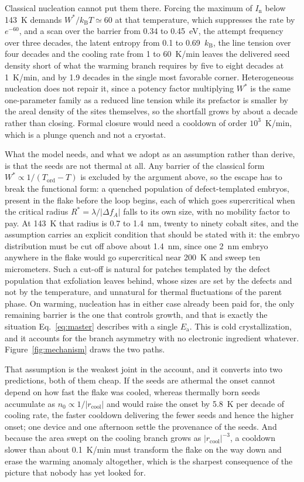 \documentclass[reprint,twocolumn,prb,amsmath,amssymb,superscriptaddress,floatfix]{revtex4-2}
\newcommand{\kB}{k_{\mathrm{B}}}
\newcommand{\Ea}{E_{\mathrm{a}}}
\newcommand{\Tcol}{T_{\mathrm{ord}}}
\begin{document}
Classical nucleation cannot put them there. Forcing the maximum of $I_{\mathrm{n}}$ below 143~K
demands $W^{*}/\kB T\simeq60$ at that temperature, which suppresses the rate by $e^{-60}$, and
a scan over the barrier from 0.34 to 0.45~eV, the attempt frequency over three decades, the
latent entropy from 0.1 to 0.69~$\kB$, the line tension over four decades and the cooling rate
from 1 to 60~K/min leaves the delivered seed density short of what the warming branch requires
by five to eight decades at 1~K/min, and by 1.9 decades in the single most favorable corner.
Heterogeneous nucleation does not repair it, since a potency factor multiplying $W^{*}$ is the
same one-parameter family as a reduced line tension while its prefactor is smaller by the areal
density of the sites themselves, so the shortfall grows by about a decade rather than closing.
Formal closure would need a cooldown of order $10^{3}$~K/min, which is a plunge quench and not a
cryostat.

What the model needs, and what we adopt as an assumption rather than derive, is that the seeds
are not thermal at all. Any barrier of the classical form $W^{*}\propto1/(\Tcol-T)$ is excluded
by the argument above, so the escape has to break the functional form: a quenched population of
defect-templated embryos, present in the flake before the loop begins, each of which goes
supercritical when the critical radius $R^{*}=\lambda/|\Delta f_{A}|$ falls to its own size,
with no mobility factor to pay. At 143~K that radius is 0.7 to 1.4~nm, twenty to ninety cobalt
sites, and the assumption carries an explicit condition that should be stated with it: the
embryo distribution must be cut off above about 1.4~nm, since one 2~nm embryo anywhere in the
flake would go supercritical near 200~K and sweep ten micrometers. Such a cut-off is natural for
patches templated by the defect population that exfoliation leaves behind, whose sizes are set
by the defects and not by the temperature, and unnatural for thermal fluctuations of the parent
phase. On warming, nucleation has in either case already been paid for, the only remaining
barrier is the one that controls growth, and that is exactly the situation
Eq.~\eqref{eq:master} describes with a single $\Ea$. This is cold crystallization, and it
accounts for the branch asymmetry with no electronic ingredient whatever.
Figure~\ref{fig:mechanism} draws the two paths.

That assumption is the weakest joint in the account, and it converts into two predictions, both
of them cheap. If the seeds are athermal the
onset cannot depend on how fast the flake was cooled, whereas thermally born seeds accumulate as
$n_{0}\propto1/|r_{\mathrm{cool}}|$ and would raise the onset by 5.8~K per decade of cooling
rate, the faster cooldown delivering the fewer seeds and hence the higher onset; one device and
one afternoon settle the provenance of the seeds. And because the area swept on the cooling
branch grows as $|r_{\mathrm{cool}}|^{-3}$, a cooldown slower than about 0.1~K/min must
transform the flake on the way down and erase the warming anomaly altogether, which is the
sharpest consequence of the picture that nobody has yet looked for.
\end{document}
